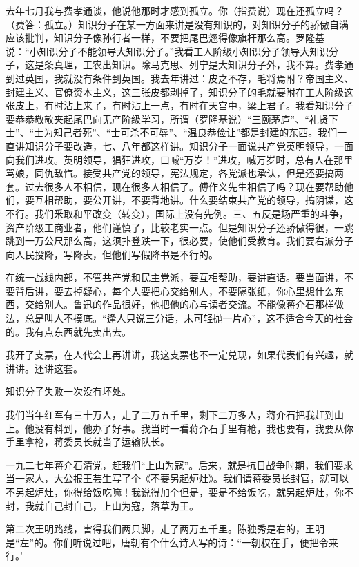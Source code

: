 去年七月我与费孝通谈，他说他那时才感到孤立。你（指费说）现在还孤立吗？（费答：孤立。）知识分子在某一方面来讲是没有知识的，对知识分子的骄傲自满应该批判，知识分子像孙行者一样，不要把尾巴翘得像旗杆那么高。罗隆基说：“小知识分子不能领导大知识分子。”我看工人阶级小知识分子领导大知识分子，这是条真理，工农出知识。除马克思、列宁是大知识分子外，我不算。费孝通到过英国，我就没有条件到英国。我去年讲过：皮之不存，毛将焉附？帝国主义、封建主义、官僚资本主义，这三张皮都剥掉了，知识分子的毛就要附在工人阶级这张皮上，有时沾上来了，有时沾上一点，有时在天宫中，梁上君子。我看知识分子要恭恭敬敬夹起尾巴向无产阶级学习，所谓（罗隆基说）“三颐茅庐”、“礼贤下士”、“士为知己者死”、“士可杀不可辱”、“温良恭俭让”都是封建的东西。我们一直讲知识分子要改造，七、八年都这样讲。知识分子一面说共产党英明领导，一面向我们进攻。英明领导，猖狂进攻，口喊“万岁！”进攻，喊万岁时，总有人在那里骂娘，同仇敌忾。接受共产党的领导，宪法规定，各党派也承认，但是还要搞两套。过去很多人不相信，现在很多人相信了。傅作义先生相信了吗？现在要帮助他们，要互相帮助，要公开讲，不要背地讲。什么要结束共产党的领导，搞阴谋，这不行。我们釆取和平改变（转变），国际上没有先例。三、五反是场严重的斗争，资产阶级工商业者，他们谨慎了，比较老实一点。但是知识分子还骄傲得很，一跳跳到一万公尺那么高，这须扑登跌一下，很必要，使他们受教育。我们要右派分子向人民投降，写降表，但他们写假降书是不行的。

在统一战线内部，不管共产党和民主党派，要互相帮助，要讲直话。要当面讲，不要背后讲，要去掉疑心，每个人要把心交给别人，不要隔张纸，你心里想什么东西，交给别人。鲁迅的作品很好，他把他的心与读者交流。不能像蒋介石那样做法，总是叫人不摸底。“逢人只说三分话，未可轻抛一片心”，这不适合今天的社会的。我有点东西就先卖出去。

我开了支票，在人代会上再讲讲，我这支票也不一定兑现，如果代表们有兴趣，就讲讲。还讲这套。

知识分子失败一次没有坏处。

我们当年红军有三十万人，走了二万五千里，剩下二万多人，蒋介石把我赶到山上。他没有料到，他办了好事。我当时一看蒋介石手里有枪，我也要有，我要从你手里拿枪，蒋委员长就当了运输队长。

一九二七年蒋介石清党，赶我们“上山为寇”。后来，就是抗日战争时期，我们要求当一家人，大公报王芸生写了个《不要另起炉灶》。我们请蒋委员长封官，就可以不另起炉灶，你得给饭吃嘛！我说得加个但是，要是不给饭吃，就另起炉灶，你不封，我就自己封自己，上山为寇，落草为王。

第二次王明路线，害得我们两只脚，走了两万五千里。陈独秀是右的，王明是“左”的。你们听说过吧，唐朝有个什么诗人写的诗：“一朝权在手，便把令来行。’

